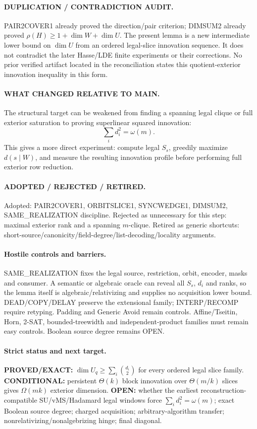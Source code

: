 \documentclass[11pt]{article}
\begin{document}
\paragraph{DUPLICATION / CONTRADICTION AUDIT.}
PAIR2COVER1 already proved the direction/pair criterion; DIMSUM2 already proved $\rho(H)\ge1+\dim W+\dim U$. The present lemma is a new intermediate lower bound on $\dim U$ from an ordered legal-slice innovation sequence. It does not contradict the later Hasse/LDE finite experiments or their corrections. No prior verified artifact located in the reconciliation states this quotient-exterior innovation inequality in this form.

\paragraph{WHAT CHANGED RELATIVE TO MAIN.}
The structural target can be weakened from finding a spanning legal clique or full exterior saturation to proving superlinear squared innovation:
\[
\sum_i d_i^2=\omega(m).
\]
This gives a more direct experiment: compute legal $S_s$, greedily maximize $d(s\mid W)$, and measure the resulting innovation profile before performing full exterior row reduction.

\paragraph{ADOPTED / REJECTED / RETIRED.}
Adopted: PAIR2COVER1, ORBITSLICE1, SYNCWEDGE1, DIMSUM2, SAME\_REALIZATION discipline.
Rejected as unnecessary for this step: maximal exterior rank and a spanning $m$-clique.
Retired as generic shortcuts: short-source/canonicity/field-degree/list-decoding/locality arguments.

\paragraph{Hostile controls and barriers.}
SAME\_REALIZATION fixes the legal source, restriction, orbit, encoder, masks and consumer. A semantic or algebraic oracle can reveal all $S_s$, $d_i$ and ranks, so the lemma itself is algebraic/relativizing and supplies no acquisition lower bound. DEAD/COPY/DELAY preserve the extensional family; INTERP/RECOMP require retyping. Padding and Generic Avoid remain controls. Affine/Tseitin, Horn, 2-SAT, bounded-treewidth and independent-product families must remain easy controls. Boolean source degree remains OPEN.

\paragraph{Strict status and next target.}
\textbf{PROVED/EXACT:} $\dim U_q\ge\sum_i\binom{d_i}{2}$ for every ordered legal slice family.
\textbf{CONDITIONAL:} persistent $\Theta(k)$ block innovation over $\Theta(m/k)$ slices gives $\Omega(mk)$ exterior dimension.
\textbf{OPEN:} whether the earliest reconstruction-compatible SU/vMS/Hadamard legal windows force $\sum_i d_i^2=\omega(m)$; exact Boolean source degree; charged acquisition; arbitrary-algorithm transfer; nonrelativizing/nonalgebrizing hinge; final diagonal.
\end{document}
